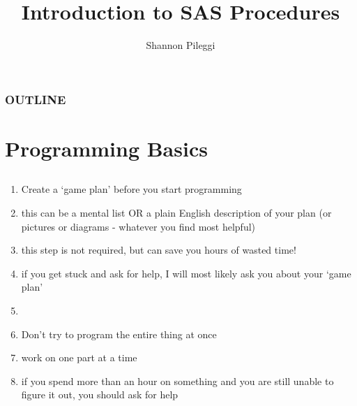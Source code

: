 





\title[Lecture 2]{Introduction to SAS Procedures}
\author[Pileggi]{Shannon Pileggi}


\date{}




\begin{frame}
\titlepage
\end{frame}

\begin{frame}
\frametitle{OUTLINE\qquad\qquad\qquad} \tableofcontents[hideallsubsections]
\end{frame}



\section[Programming Basics]{Programming Basics}

\subsection{}
\begin{frame}
\begin{enumerate}
    \item Create a `game plan' before you start programming
    \bi
    \item this can be a mental list OR a plain English description of your plan (or pictures or diagrams - whatever you find most helpful)
    \item this step is not required, but can save you hours of wasted time!
    \item if you get stuck and ask for help, I will most likely ask you about your `game plan'
    \item[]
    \ei
    \item Don't try to program the entire thing at once
    \bi
    \item work on one part at a time
    \item if you spend more than an hour on something and you are still unable to figure it out, you should ask for help
    \ei
\end{enumerate}
\end{frame}

